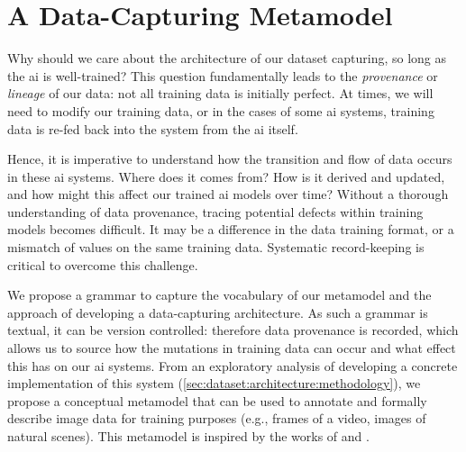 \section{A Data-Capturing Metamodel}
\label{sec:dataset:architecture}

Why should we care about the architecture of our dataset capturing, so long as the \gls{ai} is well-trained? This question fundamentally leads to the \textit{provenance} or \textit{lineage} of our data: not all training data is initially perfect. At times, we will need to modify our training data, or in the cases of some \gls{ai} systems, training data is re-fed back into the system from the \gls{ai} itself. 

Hence, it is imperative to understand how the transition and flow of data occurs \citep{Cui:2003im,Ikeda:2009ca,Buneman:2000bn} in these \gls{ai} systems. Where does it comes from? How is it derived and updated, and how might this affect our trained \gls{ai} models over time? Without a thorough understanding of data provenance, tracing potential defects within training models becomes difficult. It may be a difference in the data training format, or a mismatch of values on the same training data. Systematic record-keeping is critical to overcome this challenge.

We propose a grammar to capture the vocabulary of our metamodel and the approach of developing a data-capturing architecture. As such a grammar is textual, it can be version controlled: therefore data provenance is recorded, which allows us to source how the mutations in training data can occur and what effect this has on our \gls{ai} systems. From an exploratory analysis of developing a concrete implementation of this system (\cref{sec:dataset:architecture:methodology}), we propose a conceptual metamodel that can be used to annotate and formally describe image data for training purposes (e.g., frames of a video, images of natural scenes). This metamodel is inspired by the works of \citet{Wickham:2010hy, Wickham:2007tu} and \citet{Moody:2009vo}.




